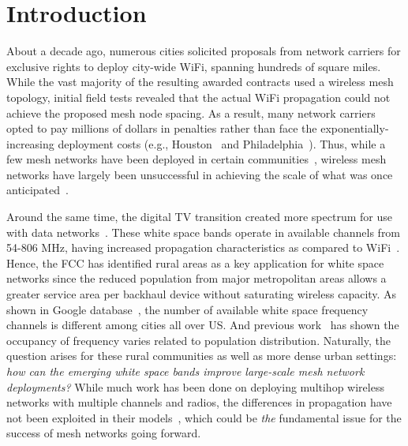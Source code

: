 \section{Introduction}
\label{sec:introduction}



About a decade ago, numerous cities solicited proposals from
network carriers for exclusive rights to deploy city-wide WiFi,
spanning hundreds of square miles.  
While the vast majority of the resulting awarded contracts used
a wireless mesh topology, initial field tests revealed that the 
actual WiFi propagation could not achieve the proposed mesh node
spacing. As a result, many network carriers opted to pay millions of 
dollars in penalties rather than face the exponentially-increasing
deployment costs (e.g., Houston~\cite{cnet_aug07} and 
Philadelphia~\cite{arstechnica_may08}). Thus, while a few mesh 
networks have been deployed in certain communities~\cite{CRSK06,google_imc08},
wireless mesh networks have largely been unsuccessful in achieving 
the scale of what was once anticipated~\cite{taps}.


Around the same time, the digital TV transition created more
spectrum for use with data networks~\cite{fccwhitespace}. These white 
space bands operate in available channels from 54-806 MHz, having
increased propagation characteristics as compared to 
WiFi~\cite{balanis2012antenna}. Hence, the FCC has identified rural
areas as a key application for white space networks since the reduced
population from major metropolitan areas allows a greater service area
per backhaul device without saturating wireless capacity. 
As shown in Google database~\cite{googledatabase}, the number of available white
space frequency channels is different among cities all over US. 
And previous work~\cite{pcuiwinmee} has shown the occupancy of 
frequency varies related to population distribution.
Naturally, 
the question arises for these rural communities as well as more dense 
urban settings: {\it how can the emerging white space bands improve 
large-scale mesh network deployments?}  While much work has been done 
on deploying multihop wireless networks with multiple channels and 
radios, the differences in propagation have not been exploited in their 
models~\cite{tang2005interference, si2010overview,long2013fair,doraghinejad2014channel}, 
which could be {\it the} fundamental issue for the success of mesh 
networks going forward.

